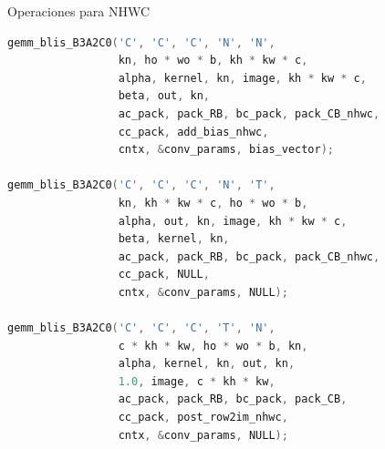 \documentclass[aspectratio=43]{beamer}
\newcommand{\subsectiontoc}[1]{
    \subsection{#1}
    \begin{frame}%
    \tableofcontents[currentsubsection]
    \end{frame}
}
\begin{document}

\begin{frame}[fragile]{Operaciones para NHWC}
\begin{lstlisting}[language=C,basicstyle=\scriptsize\ttfamily]
gemm_blis_B3A2C0('C', 'C', 'C', 'N', 'N',
                 kn, ho * wo * b, kh * kw * c,
                 alpha, kernel, kn, image, kh * kw * c,
                 beta, out, kn,
                 ac_pack, pack_RB, bc_pack, pack_CB_nhwc,
                 cc_pack, add_bias_nhwc,
                 cntx, &conv_params, bias_vector);

gemm_blis_B3A2C0('C', 'C', 'C', 'N', 'T',
                 kn, kh * kw * c, ho * wo * b,
                 alpha, out, kn, image, kh * kw * c,
                 beta, kernel, kn,
                 ac_pack, pack_RB, bc_pack, pack_CB_nhwc,
                 cc_pack, NULL,
                 cntx, &conv_params, NULL);

gemm_blis_B3A2C0('C', 'C', 'C', 'T', 'N',
                 c * kh * kw, ho * wo * b, kn,
                 alpha, kernel, kn, out, kn,
                 1.0, image, c * kh * kw,
                 ac_pack, pack_RB, bc_pack, pack_CB,
                 cc_pack, post_row2im_nhwc,
                 cntx, &conv_params, NULL);
\end{lstlisting}
\end{frame}

\begin{frame}%
\end{frame}

\begin{frame}%
\end{frame}

\begin{frame}%
\end{frame}
\end{document}
